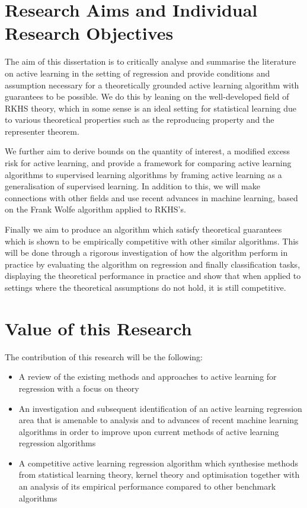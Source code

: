 \section{Research Aims and Individual Research Objectives}
The aim of this dissertation is to critically analyse and summarise the
literature on active learning in the setting of regression and provide
conditions and assumption necessary for a theoretically grounded active learning
algorithm with guarantees to be possible. We do this by leaning on the
well-developed field of RKHS theory, which in some sense is an ideal setting for
statistical learning due to various theoretical properties such as the
reproducing property and the representer theorem.

We further aim to derive bounds on the quantity of interest, a modified excess
risk for active learning, and provide a framework for comparing active learning
algorithms to supervised learning algorithms by framing active learning as a
generalisation of supervised learning. In addition to this, we will make
connections with other fields and use recent advances in machine learning, based
on the Frank Wolfe algorithm applied to RKHS's.

Finally we aim to produce an algorithm which satisfy theoretical guarantees
which is shown to be empirically competitive with other similar algorithms. This
will be done through a rigorous investigation of how the algorithm perform in
practice by evaluating the algorithm on regression and finally classification
tasks, displaying the theoretical performance in practice and show that when
applied to settings where the theoretical assumptions do not hold, it is still
competitive.

\section{Value of this Research}
The contribution of this research will be the following:
\begin{itemize}
\item A review of the existing methods and approaches to active learning for
  regression with a focus on theory
\item An investigation and subsequent identification of an active learning
  regression area that is amenable to analysis and to advances of recent machine
  learning algorithms in order to improve upon current methods of active learning
  regression algorithms
\item A competitive active learning regression algorithm which synthesise methods from
  statistical learning theory, kernel theory and optimisation together with an
  analysis of its empirical performance compared to other benchmark algorithms
\end{itemize}